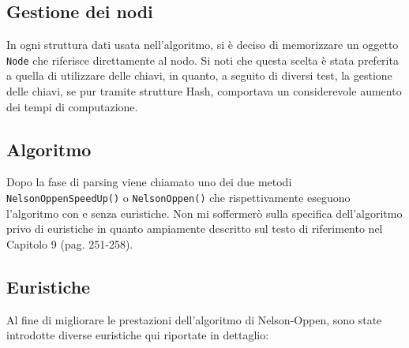 \documentclass[a4paper,11pt]{article}
\begin{document}
\subsection{Gestione dei nodi}
In ogni struttura dati usata nell'algoritmo, si è deciso di memorizzare un oggetto {\tt Node} che riferisce direttamente al nodo.
Si noti che questa scelta è stata preferita a quella di utilizzare delle chiavi, in quanto, a seguito di diversi test, la gestione delle chiavi, se pur tramite strutture Hash, comportava un considerevole aumento dei tempi di computazione.
\subsection{Algoritmo}
Dopo la fase di parsing viene chiamato uno dei due metodi {\tt NelsonOppenSpeedUp()} o {\tt NelsonOppen()} che rispettivamente eseguono l'algoritmo con e senza euristiche.
Non mi soffermerò sulla specifica dell'algoritmo privo di euristiche in quanto ampiamente descritto sul testo di riferimento nel Capitolo 9 (pag. 251-258).

\subsection{Euristiche}
Al fine di migliorare le prestazioni dell'algoritmo di Nelson-Oppen, sono state introdotte diverse euristiche qui riportate in dettaglio:
\end{document}
